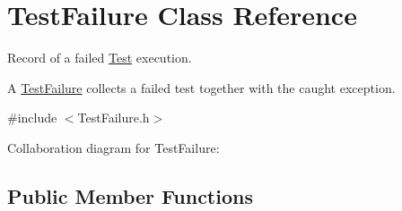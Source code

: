 \hypertarget{class_test_failure}{\section{Test\+Failure Class Reference}
\label{class_test_failure}
}


Record of a failed \hyperlink{class_test}{Test} execution.

A \hyperlink{class_test_failure}{Test\+Failure} collects a failed test together with the caught exception.  




{\ttfamily \#include $<$Test\+Failure.\+h$>$}



Collaboration diagram for Test\+Failure\+:
\subsection*{Public Member Functions}
